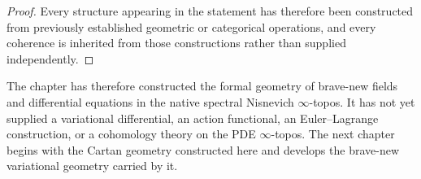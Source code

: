 \begin{proof}
Every structure appearing in the statement has therefore been constructed from previously established geometric or categorical operations, and every coherence is inherited from those constructions rather than supplied independently.
\end{proof}

The chapter has therefore constructed the formal geometry of brave-new fields and differential equations in the native spectral Nisnevich $\infty$-topos.  It has not yet supplied a variational differential, an action functional, an Euler--Lagrange construction, or a cohomology theory on the PDE $\infty$-topos.  The next chapter begins with the Cartan geometry constructed here and develops the brave-new variational geometry carried by it.
